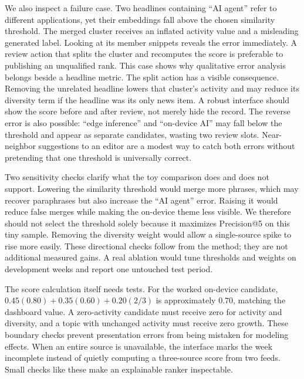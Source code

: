 \documentclass[../../proceedings/main.tex]{subfiles}
\begin{document}
\begin{refsection}
We also inspect a failure case. Two headlines containing ``AI agent'' refer
to different applications, yet their embeddings fall above the chosen
similarity threshold. The merged cluster receives an inflated activity value
and a misleading generated label. Looking at its member snippets reveals
the error immediately. A review action that splits the cluster and recomputes
the score is preferable to publishing an unqualified rank. This case shows
why qualitative error analysis belongs beside a headline metric.
The split action has a visible consequence. Removing the unrelated headline
lowers that cluster's activity and may reduce its diversity term if the
headline was its only news item. A robust interface should show the score
before and after review, not merely hide the record. The reverse error is
also possible: ``edge inference'' and ``on-device AI'' may fall below the
threshold and appear as separate candidates, wasting two review slots.
Near-neighbor suggestions to an editor are a modest way to catch both errors
without pretending that one threshold is universally correct.

Two sensitivity checks clarify what the toy comparison does and does not
support. Lowering the similarity threshold would merge more phrases, which
may recover paraphrases but also increase the ``AI agent'' error. Raising it
would reduce false merges while making the on-device theme less visible. We
therefore should not select the threshold solely because it maximizes
Precision@5 on this tiny sample. Removing the diversity weight would allow a
single-source spike to rise more easily. These directional checks follow
from the method; they are not additional measured gains. A real ablation
would tune thresholds and weights on development weeks and report one
untouched test period.

The score calculation itself needs tests. For the worked on-device candidate,
$0.45(0.80)+0.35(0.60)+0.20(2/3)$ is approximately $0.70$, matching the
dashboard value. A zero-activity candidate must receive zero for activity
and diversity, and a topic with unchanged activity must receive zero growth.
These boundary checks prevent presentation errors from being mistaken for
modeling effects. When an entire source is unavailable, the interface marks
the week incomplete instead of quietly computing a three-source score from
two feeds. Small checks like these make an explainable ranker inspectable.


\end{refsection}
\end{document}
